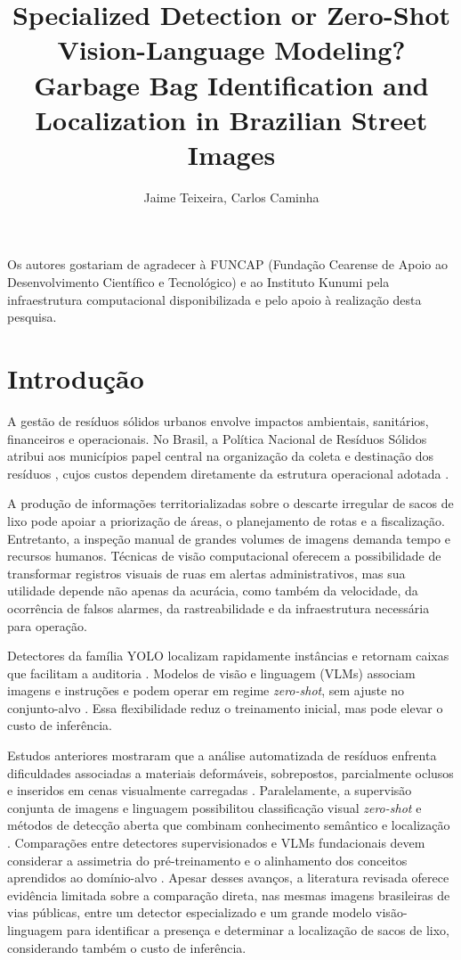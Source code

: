 \documentclass[kdmile,a4paper]{kdmile}
\title{Specialized Detection or Zero-Shot Vision-Language Modeling? Garbage Bag Identification and Localization in Brazilian Street Images}
\author{Jaime Teixeira, Carlos Caminha}
\institute{Kunumi Lab - Universidade Federal do Ceará (UFC), Fortaleza, CE, Brasil\\
\email{jaimejrs@alu.ufc.br, caminha@ufc.br}}
\begin{document}
\begin{bottomstuff}
Os autores gostariam de agradecer à FUNCAP (Fundação Cearense de Apoio ao Desenvolvimento Científico e Tecnológico) e ao Instituto Kunumi pela infraestrutura computacional disponibilizada e pelo apoio à realização desta pesquisa.
\end{bottomstuff}

\maketitle

\section{Introdução}
\label{sec:introducao}

A gestão de resíduos sólidos urbanos envolve impactos ambientais, sanitários, financeiros e operacionais. No Brasil, a Política Nacional de Resíduos Sólidos atribui aos municípios papel central na organização da coleta e destinação dos resíduos \cite{Brasil2010}, cujos custos dependem diretamente da estrutura operacional adotada \cite{Rodrigues2016}.

A produção de informações territorializadas sobre o descarte irregular de sacos de lixo pode apoiar a priorização de áreas, o planejamento de rotas e a fiscalização. Entretanto, a inspeção manual de grandes volumes de imagens demanda tempo e recursos humanos. Técnicas de visão computacional oferecem a possibilidade de transformar registros visuais de ruas em alertas administrativos, mas sua utilidade depende não apenas da acurácia, como também da velocidade, da ocorrência de falsos alarmes, da rastreabilidade e da infraestrutura necessária para operação.

Detectores da família YOLO localizam rapidamente instâncias e retornam caixas que facilitam a auditoria \cite{Redmon2016YOLO,Ultralytics2024YOLO11}. Modelos de visão e linguagem (VLMs) associam imagens e instruções e podem operar em regime \emph{zero-shot}, sem ajuste no conjunto-alvo \cite{Radford2021CLIP}. Essa flexibilidade reduz o treinamento inicial, mas pode elevar o custo de inferência.

Estudos anteriores mostraram que a análise automatizada de resíduos enfrenta dificuldades associadas a materiais deformáveis, sobrepostos, parcialmente oclusos e inseridos em cenas visualmente carregadas \cite{Bashkirova2022ZeroWaste,Abid2025WasteDetection}. Paralelamente, a supervisão conjunta de imagens e linguagem possibilitou classificação visual \emph{zero-shot} \cite{Radford2021CLIP} e métodos de detecção aberta que combinam conhecimento semântico e localização \cite{Kuo2023FVLM,Jin2024FineGrainedDescriptors}. Comparações entre detectores supervisionados e VLMs fundacionais devem considerar a assimetria do pré-treinamento e o alinhamento dos conceitos aprendidos ao domínio-alvo \cite{Madan2024FewShotVLM}. Apesar desses avanços, a literatura revisada oferece evidência limitada sobre a comparação direta, nas mesmas imagens brasileiras de vias públicas, entre um detector especializado e um grande modelo visão-linguagem para identificar a presença e determinar a localização de sacos de lixo, considerando também o custo de inferência.
\end{document}
